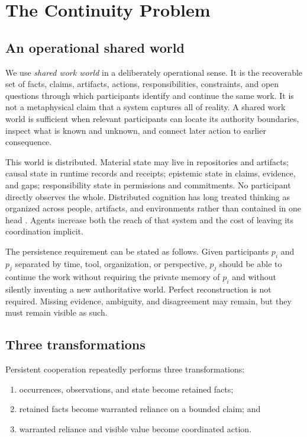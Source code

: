 \section{The Continuity Problem}
\label{sec:problem}

\subsection{An operational shared world}

We use \emph{shared work world} in a deliberately operational sense. It is the
recoverable set of facts, claims, artifacts, actions, responsibilities,
constraints, and open questions through which participants identify and
continue the same work. It is not a metaphysical claim that a system captures
all of reality. A shared work world is sufficient when relevant participants
can locate its authority boundaries, inspect what is known and unknown, and
connect later action to earlier consequence.

This world is distributed. Material state may live in repositories and
artifacts; causal state in runtime records and receipts; epistemic state in
claims, evidence, and gaps; responsibility state in permissions and
commitments. No participant directly observes the whole. Distributed
cognition has long treated thinking as organized across people, artifacts,
and environments rather than contained in one head
\cite{hutchins1995cognition}. Agents increase both the reach of that system
and the cost of leaving its coordination implicit.

The persistence requirement can be stated as follows. Given participants
$p_i$ and $p_j$ separated by time, tool, organization, or perspective, $p_j$
should be able to continue the work without requiring the private memory of
$p_i$ and without silently inventing a new authoritative world. Perfect
reconstruction is not required. Missing evidence, ambiguity, and disagreement
may remain, but they must remain visible as such.

\subsection{Three transformations}

Persistent cooperation repeatedly performs three transformations:

\begin{enumerate}[leftmargin=*]
  \item occurrences, observations, and state become retained facts;
  \item retained facts become warranted reliance on a bounded claim; and
  \item warranted reliance and visible value become coordinated action.
\end{enumerate}

